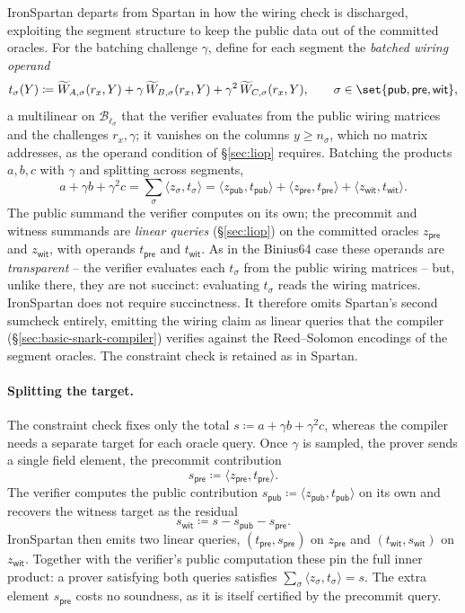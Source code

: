 \documentclass{article}
\theoremstyle{definition}
\newcommand*{\mle}{\widetilde}
\newcommand{\BB}{\mathcal{B}}
\begin{document}
IronSpartan departs from Spartan in how the wiring check is discharged, exploiting the segment structure to keep the public data out of the committed oracles. For the batching challenge $\gamma$, define for each segment the \emph{batched wiring operand}
\[
  t_\sigma(Y) \coloneqq \mle{W}_{A, \sigma}(r_x, Y) + \gamma\, \mle{W}_{B, \sigma}(r_x, Y) + \gamma^2\, \mle{W}_{C, \sigma}(r_x, Y), \qquad \sigma \in \set{\textsf{pub}, \textsf{pre}, \textsf{wit}},
\]
a multilinear on $\BB_{\ell_\sigma}$ that the verifier evaluates from the public wiring matrices and the challenges $r_x, \gamma$; it vanishes on the columns $y \ge n_\sigma$, which no matrix addresses, as the operand condition of \S\ref{sec:liop} requires. Batching the products $a, b, c$ with $\gamma$ and splitting across segments,
\[
  a + \gamma b + \gamma^2 c = \sum_{\sigma} \langle z_\sigma, t_\sigma \rangle = \langle z_{\textsf{pub}}, t_{\textsf{pub}} \rangle + \langle z_{\textsf{pre}}, t_{\textsf{pre}} \rangle + \langle z_{\textsf{wit}}, t_{\textsf{wit}} \rangle.
\]
The public summand the verifier computes on its own; the precommit and witness summands are \emph{linear queries} (\S\ref{sec:liop}) on the committed oracles $z_{\textsf{pre}}$ and $z_{\textsf{wit}}$, with operands $t_{\textsf{pre}}$ and $t_{\textsf{wit}}$. As in the Binius64 case these operands are \emph{transparent} -- the verifier evaluates each $t_\sigma$ from the public wiring matrices -- but, unlike there, they are not succinct: evaluating $t_\sigma$ reads the wiring matrices. IronSpartan does not require succinctness. It therefore omits Spartan's second sumcheck entirely, emitting the wiring claim as linear queries that the compiler (\S\ref{sec:basic-snark-compiler}) verifies against the Reed--Solomon encodings of the segment oracles. The constraint check is retained as in Spartan.

\paragraph{Splitting the target.}
The constraint check fixes only the total $s \coloneqq a + \gamma b + \gamma^2 c$, whereas the compiler needs a separate target for each oracle query. Once $\gamma$ is sampled, the prover sends a single field element, the precommit contribution
\[
  s_{\textsf{pre}} \coloneqq \langle z_{\textsf{pre}}, t_{\textsf{pre}} \rangle.
\]
The verifier computes the public contribution $s_{\textsf{pub}} \coloneqq \langle z_{\textsf{pub}}, t_{\textsf{pub}} \rangle$ on its own and recovers the witness target as the residual
\[
  s_{\textsf{wit}} \coloneqq s - s_{\textsf{pub}} - s_{\textsf{pre}}.
\]
IronSpartan then emits two linear queries, $(t_{\textsf{pre}}, s_{\textsf{pre}})$ on $z_{\textsf{pre}}$ and $(t_{\textsf{wit}}, s_{\textsf{wit}})$ on $z_{\textsf{wit}}$. Together with the verifier's public computation these pin the full inner product: a prover satisfying both queries satisfies $\sum_\sigma \langle z_\sigma, t_\sigma \rangle = s$. The extra element $s_{\textsf{pre}}$ costs no soundness, as it is itself certified by the precommit query.
\end{document}
